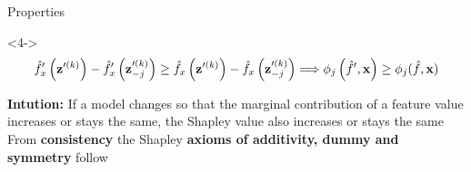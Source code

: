 \documentclass[11pt,compress,t,notes=noshow, aspectratio=169, xcolor=table]{beamer}
\begin{document}
\begin{frame}{Properties}
\begin{onlyenv}<4->
$$
\hat{f}_{x}^{\prime}\left(\mathbf{z}^{\prime (k)}\right)-\hat{f}_{x}^{\prime}\left(\mathbf{z}^{\prime (k)}_{-j}\right) \geq \hat{f}_{x}\left(\mathbf{z}^{\prime (k)}\right)-\hat{f}_{x}\left(\mathbf{z}^{\prime (k)} _{-j}\right) \Longrightarrow \phi_{j}\left(\hat{f}^{\prime}, \mathbf{x}\right) \geq \phi_{j}(\hat{f}, \mathbf{x})
$$

\textbf{Intution:} If a model changes so that the marginal contribution of a feature value increases or stays the same, the Shapley value also increases or stays the same\\\medskip 
From \textbf{consistency} the Shapley \textbf{axioms of additivity, dummy and symmetry} follow
\end{onlyenv}


\end{frame}





     
\end{document}
